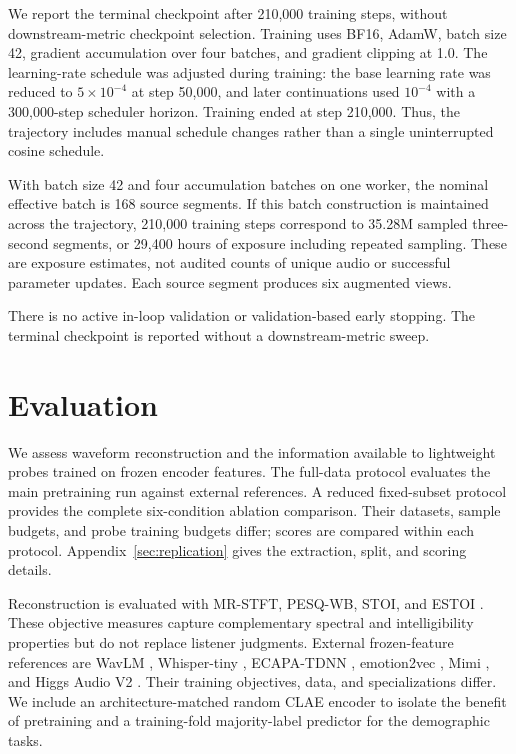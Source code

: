 \documentclass[11pt,a4paper]{article}
\begin{document}
We report the terminal checkpoint after 210,000 training steps, without downstream-metric checkpoint selection. Training uses BF16, AdamW, batch size 42, gradient accumulation over four batches, and gradient clipping at 1.0. The learning-rate schedule was adjusted during training: the base learning rate was reduced to $5\times10^{-4}$ at step 50,000, and later continuations used $10^{-4}$ with a 300,000-step scheduler horizon. Training ended at step 210,000. Thus, the trajectory includes manual schedule changes rather than a single uninterrupted cosine schedule.

With batch size 42 and four accumulation batches on one worker, the nominal effective batch is 168 source segments. If this batch construction is maintained across the trajectory, 210,000 training steps correspond to 35.28M sampled three-second segments, or 29,400 hours of exposure including repeated sampling. These are exposure estimates, not audited counts of unique audio or successful parameter updates. Each source segment produces six augmented views.

There is no active in-loop validation or validation-based early stopping. The terminal checkpoint is reported without a downstream-metric sweep.

\section{Evaluation}
\label{sec:evaluation}

We assess waveform reconstruction and the information available to lightweight probes trained on frozen encoder features. The full-data protocol evaluates the main pretraining run against external references. A reduced fixed-subset protocol provides the complete six-condition ablation comparison. Their datasets, sample budgets, and probe training budgets differ; scores are compared within each protocol. Appendix~\ref{sec:replication} gives the extraction, split, and scoring details.

Reconstruction is evaluated with MR-STFT, PESQ-WB, STOI, and ESTOI \citep{yamamoto2020parallelwavegan,rix2001pesq,taal2010stoi,jensen2016estoi}. These objective measures capture complementary spectral and intelligibility properties but do not replace listener judgments. External frozen-feature references are WavLM \citep{chen2022wavlm}, Whisper-tiny \citep{radford2023whisper}, ECAPA-TDNN \citep{desplanques2020ecapa}, emotion2vec \citep{ma2024emotion2vec}, Mimi \citep{defossez2024moshi}, and Higgs Audio V2 \citep{boson2025higgsaudiov2tokenizer}. Their training objectives, data, and specializations differ. We include an architecture-matched random CLAE encoder to isolate the benefit of pretraining and a training-fold majority-label predictor for the demographic tasks.
\end{document}
